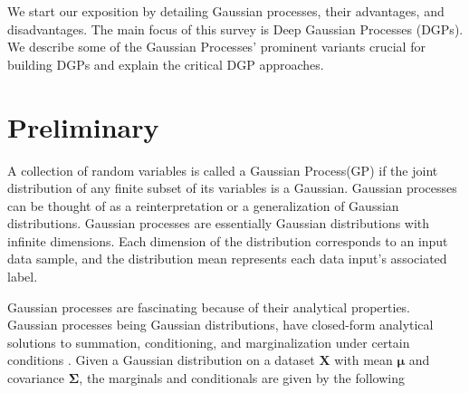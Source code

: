 \documentclass[letterpaper,11pt]{extarticle}
\begin{document}
We start our exposition by detailing Gaussian processes, their advantages, and disadvantages. The main focus of this survey is Deep Gaussian Processes (DGPs). We describe some of the Gaussian Processes' prominent variants crucial for building DGPs and explain the critical DGP approaches. 

\section{Preliminary}

A collection of random variables is called a Gaussian Process(GP) if the joint distribution of any finite subset of its variables is a Gaussian. Gaussian processes can be thought of as a reinterpretation or a generalization of Gaussian distributions. Gaussian processes are essentially Gaussian distributions with infinite dimensions. Each dimension of the distribution corresponds to an input data sample, and the distribution mean represents each data input's associated label. 

Gaussian processes are fascinating because of their analytical properties. Gaussian processes being Gaussian distributions, have closed-form analytical solutions to summation, conditioning, and marginalization under certain conditions \cite{Murphy12}. Given a Gaussian distribution on a dataset $\mathbf{X}$ with mean $\boldsymbol{\mu}$ and covariance $\mathbf{\Sigma}$, the marginals and conditionals are given by the following
\end{document}

